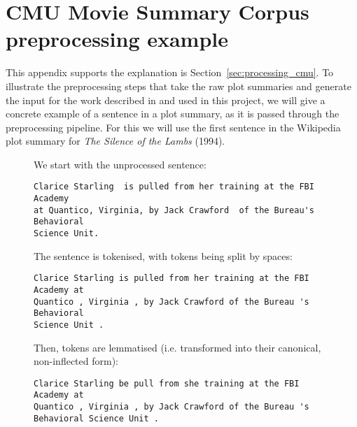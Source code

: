\chapter{CMU Movie Summary Corpus preprocessing example}
\label{appendix:cmu}
This appendix supports the explanation is Section~\ref{sec:processing_cmu}. To illustrate the preprocessing steps that take the raw plot summaries and generate the input for the work described in \cite{Bamman2013} and used in this project, we will give a concrete example of a sentence in a plot summary, as it is passed through the preprocessing pipeline. For this we will use the first sentence in the Wikipedia plot summary for \textit{The Silence of the Lambs} (1994).

\begin{figure}[h!]
\centering
\begin{minipage}{14.5cm}
We start with the unprocessed sentence:
\vspace{1.5mm}
\begin{Verbatim}[frame=single]
Clarice Starling  is pulled from her training at the FBI Academy 
at Quantico, Virginia, by Jack Crawford  of the Bureau's Behavioral 
Science Unit.
\end{Verbatim}
\end{minipage}
\end{figure}

\begin{figure}[h!]
\centering
\begin{minipage}{14.5cm}
The sentence is tokenised, with tokens being split by spaces:
\vspace{1.5mm}
\begin{Verbatim}[frame=single]
Clarice Starling is pulled from her training at the FBI Academy at 
Quantico , Virginia , by Jack Crawford of the Bureau 's Behavioral 
Science Unit .
\end{Verbatim}
\end{minipage}
\end{figure}

\begin{figure}[h!]
\centering
\begin{minipage}{14.5cm}
Then, tokens are lemmatised (i.e. transformed into their canonical, non-inflected form):
\vspace{1.5mm}
\begin{Verbatim}[frame=single]
Clarice Starling be pull from she training at the FBI Academy at 
Quantico , Virginia , by Jack Crawford of the Bureau 's 
Behavioral Science Unit .
\end{Verbatim}
\end{minipage}
\end{figure}

